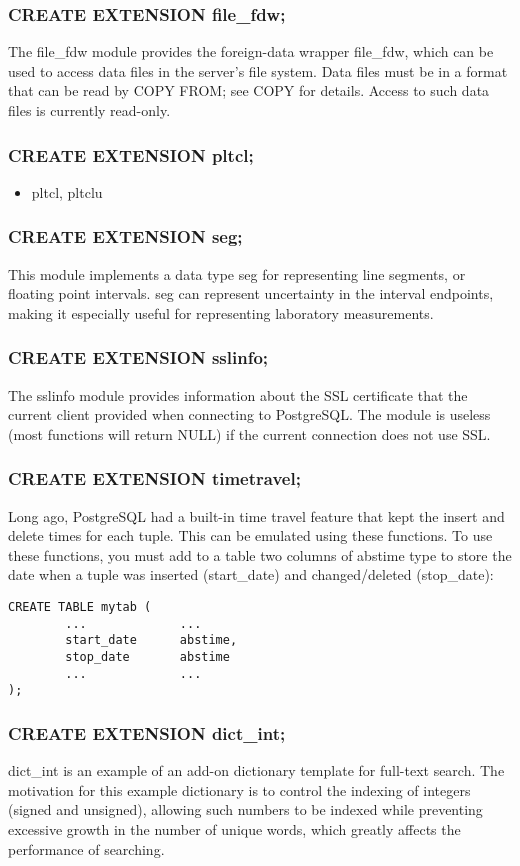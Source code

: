 \documentclass[utf8,hyperref={pdftex,colorlinks,linkcolor=black,citecolor=black,urlcolor=black,filecolor=black,plainpages=false},xcolor=table,hyperref]{beamer}
\begin{document}
\begin{frame}[containsverbatim]
	\frametitle{CREATE EXTENSION file_fdw;}
	The file_fdw module provides the foreign-data wrapper file_fdw, which can be used to access data files in the server's file system. Data files must be in a format that can be read by COPY FROM; see COPY for details. Access to such data files is currently read-only. 
\end{frame}

\begin{frame}[containsverbatim]
	\frametitle{CREATE EXTENSION pltcl;}
	\begin{itemize}
		\item pltcl, pltclu
	\end{itemize}
\end{frame}

\begin{frame}[containsverbatim]
	\frametitle{CREATE EXTENSION seg;}
	This module implements a data type seg for representing line segments, or floating point intervals. seg can represent uncertainty in the interval endpoints, making it especially useful for representing laboratory measurements. 
\end{frame}

\begin{frame}[containsverbatim]
	\frametitle{CREATE EXTENSION sslinfo;}
	The sslinfo module provides information about the SSL certificate that the current client provided when connecting to PostgreSQL. The module is useless (most functions will return NULL) if the current connection does not use SSL. 
\end{frame}

\begin{frame}[containsverbatim]
	\frametitle{CREATE EXTENSION timetravel;}
	 Long ago, PostgreSQL had a built-in time travel feature that kept the insert and delete times for each tuple. This can be emulated using these functions. To use these functions, you must add to a table two columns of abstime type to store the date when a tuple was inserted (start_date) and changed/deleted (stop_date):

	 \begin{verbatim}
CREATE TABLE mytab (
        ...             ...
        start_date      abstime,
        stop_date       abstime
        ...             ...
);
\end{verbatim}
\end{frame}

\begin{frame}[containsverbatim]
	\frametitle{CREATE EXTENSION dict_int;}
	dict_int is an example of an add-on dictionary template for full-text search. The motivation for this example dictionary is to control the indexing of integers (signed and unsigned), allowing such numbers to be indexed while preventing excessive growth in the number of unique words, which greatly affects the performance of searching. 
\end{frame}
\end{document}
